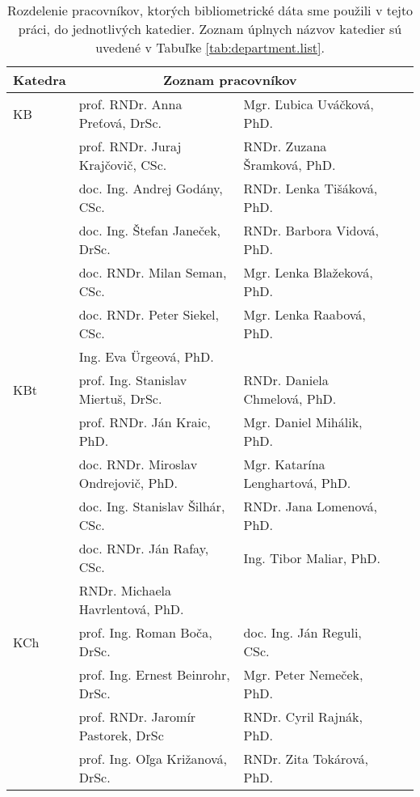 \begin{table}
  \caption[Rozdelenie pracovníkov do jednotlivých katedier]{Rozdelenie
  pracovníkov, ktorých bibliometrické dáta sme použili v tejto práci, do
  jednotlivých katedier. Zoznam úplnych názvov katedier sú uvedené v Tabuľke
  \ref{tab:department.list}.} 
  \label{tab:academics.list}
\centering\small
\begin{tabular}{lllll}
  \toprule\noalign{\vspace{.3ex}}
   Katedra& \multicolumn{2}{c}{Zoznam pracovníkov}                  \\[0.3ex]
  \midrule\noalign{\vspace{.5ex}}
  KB   & prof. RNDr. Anna Preťová, DrSc. &  Mgr. Ľubica Uváčková, PhD.      \\ 
       & prof. RNDr. Juraj Krajčovič, CSc.& RNDr. Zuzana Šramková, PhD.       \\
       & doc. Ing. Andrej Godány, CSc. &    RNDr. Lenka Tišáková, PhD.     \\
       & doc. Ing. Štefan Janeček, DrSc.&   RNDr. Barbora Vidová, PhD.      \\
       & doc. RNDr. Milan Seman, CSc. &     Mgr. Lenka Blažeková, PhD.    \\
       & doc. RNDr. Peter Siekel, CSc. &    Mgr. Lenka Raabová, PhD.     \\
       & Ing. Eva Ürgeová, PhD. &    \\ [2ex]
  KBt  & prof. Ing. Stanislav Miertuš, DrSc.  & RNDr. Daniela Chmelová, PhD.            \\
       & prof. RNDr. Ján Kraic, PhD.          & Mgr. Daniel Mihálik, PhD.            \\
       & doc. RNDr. Miroslav Ondrejovič, PhD. & Mgr. Katarína Lenghartová, PhD.            \\
       & doc. Ing. Stanislav Šilhár, CSc.     & RNDr. Jana Lomenová, PhD.            \\
       & doc. RNDr. Ján Rafay, CSc.           & Ing. Tibor Maliar, PhD.            \\
       & RNDr. Michaela Havrlentová, PhD.     &            \\[2ex]
  KCh  & prof. Ing. Roman Boča, DrSc. & doc. Ing. Ján Reguli, CSc. \\
       & prof. Ing. Ernest Beinrohr, DrSc. & Mgr. Peter Nemeček, PhD. \\
       & prof. RNDr. Jaromír Pastorek, DrSc & RNDr. Cyril Rajnák, PhD. \\
       & prof. Ing. Oľga Križanová, DrSc. & RNDr. Zita Tokárová, PhD. \\ 

\end{tabular}
\end{table}
